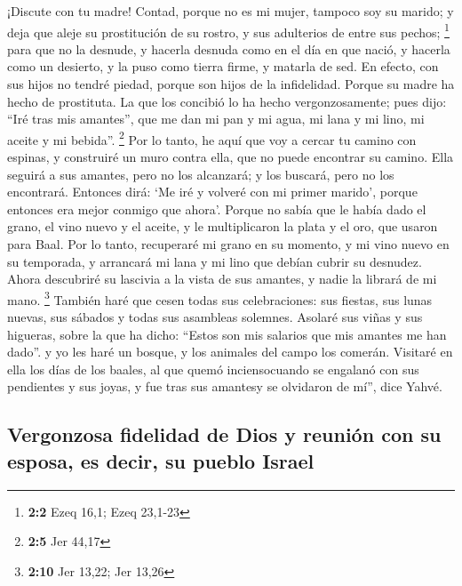 \begin{paracol}{2}
 ¡Discute con tu madre! Contad, porque no es mi mujer,
tampoco soy su marido; y deja que aleje su prostitución de su rostro, y
sus adulterios de entre sus pechos; \footnote{\textbf{2:2} Ezeq 16,1;
  Ezeq 23,1-23}  para que no la desnude, y hacerla desnuda
como en el día en que nació, y hacerla como un desierto, y la puso como
tierra firme, y matarla de sed.  En efecto, con sus hijos
no tendré piedad, porque son hijos de la infidelidad. 
Porque su madre ha hecho de prostituta. La que los concibió lo ha hecho
vergonzosamente; pues dijo: ``Iré tras mis amantes'', que me dan mi pan
y mi agua, mi lana y mi lino, mi aceite y mi bebida''. \footnote{\textbf{2:5}
  Jer 44,17}  Por lo tanto, he aquí que voy a cercar tu
camino con espinas, y construiré un muro contra ella, que no puede
encontrar su camino.  Ella seguirá a sus amantes, pero no
los alcanzará; y los buscará, pero no los encontrará. Entonces dirá: `Me
iré y volveré con mi primer marido', porque entonces era mejor conmigo
que ahora'.  Porque no sabía que le había dado el grano,
el vino nuevo y el aceite, y le multiplicaron la plata y el oro, que
usaron para Baal.  Por lo tanto, recuperaré mi grano en su
momento, y mi vino nuevo en su temporada, y arrancará mi lana y mi lino
que debían cubrir su desnudez.  Ahora descubriré su
lascivia a la vista de sus amantes, y nadie la librará de mi mano.
\footnote{\textbf{2:10} Jer 13,22; Jer 13,26}  También
haré que cesen todas sus celebraciones: sus fiestas, sus lunas nuevas,
sus sábados y todas sus asambleas solemnes.  Asolaré sus
viñas y sus higueras, sobre la que ha dicho: ``Estos son mis salarios
que mis amantes me han dado''. y yo les haré un bosque, y los animales
del campo los comerán.  Visitaré en ella los días de los
baales, al que quemó inciensocuando se engalanó con sus pendientes y sus
joyas, y fue tras sus amantesy se olvidaron de mí'', dice Yahvé.

\hypertarget{vergonzosa-fidelidad-de-dios-y-reuniuxf3n-con-su-esposa-es-decir-su-pueblo-israel}{%
\subsection{Vergonzosa fidelidad de Dios y reunión con su esposa, es
decir, su pueblo
Israel}\label{vergonzosa-fidelidad-de-dios-y-reuniuxf3n-con-su-esposa-es-decir-su-pueblo-israel}}


\end{paracol}

